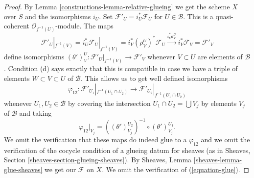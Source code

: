 \begin{proof}

By Lemma \ref{constructions-lemma-relative-glueing} we get the scheme $X$ over $S$
and the isomorphisms $i_U$.
Set $\mathcal{F}'_U = i_U^*\mathcal{F}_U$ for $U \in \mathcal{B}$.
This is a quasi-coherent $\mathcal{O}_{f^{-1}(U)}$-module.
The maps
$$
\mathcal{F}'_U|_{f^{-1}(V)} =
i_U^*\mathcal{F}_U|_{f^{-1}(V)} =
i_V^*(\rho^U_V)^*\mathcal{F}_U \xrightarrow{i_V^*\theta^U_V}
i_V^*\mathcal{F}_V = \mathcal{F}'_V
$$
define isomorphisms
$(\theta')^U_V : \mathcal{F}'_U|_{f^{-1}(V)} \to \mathcal{F}'_V$
whenever $V \subset U$ are elements of $\mathcal{B}$.
Condition (d) says exactly that this is compatible in case
we have a triple of elements $W \subset V \subset U$ of $\mathcal{B}$.
This allows us to get well defined isomorphisms
$$
\varphi_{12} :
\mathcal{F}'_{U_1}|_{f^{-1}(U_1 \cap U_2)}
\longrightarrow
\mathcal{F}'_{U_2}|_{f^{-1}(U_1 \cap U_2)}
$$
whenever $U_1, U_2 \in \mathcal{B}$ by covering the intersection
$U_1 \cap U_2 = \bigcup V_j$ by elements $V_j$ of $\mathcal{B}$
and taking
$$
\varphi_{12}|_{V_j} =
\left((\theta')^{U_2}_{V_j}\right)^{-1}
\circ
(\theta')^{U_1}_{V_j}.
$$
We omit the verification that these maps do indeed glue to a
$\varphi_{12}$ and we omit the verification of the
cocycle condition of a glueing datum for sheaves
(as in Sheaves, Section \ref{sheaves-section-glueing-sheaves}).
By Sheaves, Lemma \ref{sheaves-lemma-glue-sheaves}
we get our $\mathcal{F}$ on $X$. We omit the verification
of (\ref{equation-glue}).
\end{proof}

